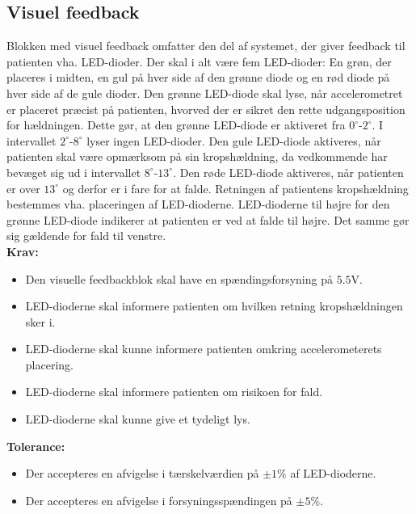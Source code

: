 \subsection{Visuel feedback}
Blokken med visuel feedback omfatter den del af systemet, der giver feedback til patienten vha. LED-dioder. Der skal i alt være fem LED-dioder: En grøn, der placeres i midten, en gul på hver side af den grønne diode og en rød diode på hver side af de gule dioder. Den grønne LED-diode skal lyse, når accelerometret er placeret præcist på patienten, hvorved der er sikret den rette udgangsposition for hældningen. Dette gør, at den grønne LED-diode er aktiveret fra $0^{\circ}$-$2^{\circ}$. I intervallet $2^{\circ}$-$8^{\circ}$ lyser ingen LED-dioder. Den gule LED-diode aktiveres, når patienten skal være opmærksom på sin kropshældning, da vedkommende har bevæget sig ud i intervallet $8^{\circ}$-$13^{\circ}$. Den røde LED-diode aktiveres, når patienten er over $13^{\circ}$ og derfor er i fare for at falde. Retningen af patientens kropshældning bestemmes vha. placeringen af LED-dioderne. LED-dioderne til højre for den grønne LED-diode indikerer at patienten er ved at falde til højre. Det samme gør sig gældende for fald til venstre. 
\\
\textbf{Krav:}
\begin{itemize}
	\item Den visuelle feedbackblok skal have en spændingsforsyning på  $5.5$V.
	\item LED-dioderne skal informere patienten om hvilken retning kropshældningen sker i.
	\item LED-dioderne skal kunne informere patienten omkring accelerometerets placering.
	\item LED-dioderne skal informere patienten om risikoen for fald.
	\item LED-dioderne skal kunne give et tydeligt lys.
\end{itemize}
\textbf{Tolerance:}
\begin{itemize}
	\item Der accepteres en afvigelse i tærskelværdien på $\pm1\%$ af LED-dioderne.
	\item Der accepteres en afvigelse i forsyningsspændingen på $\pm5\%$.
\end{itemize}
